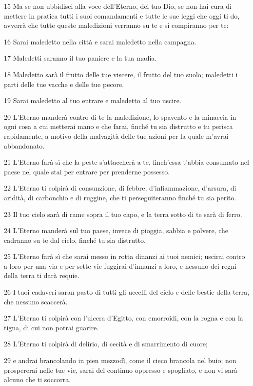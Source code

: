 \par 15 Ma se non ubbidisci alla voce dell'Eterno, del tuo Dio, se non hai cura di mettere in pratica tutti i suoi comandamenti e tutte le sue leggi che oggi ti do, avverrà che tutte queste maledizioni verranno su te e si compiranno per te:
\par 16 Sarai maledetto nella città e sarai maledetto nella campagna.
\par 17 Maledetti saranno il tuo paniere e la tua madia.
\par 18 Maledetto sarà il frutto delle tue viscere, il frutto del tuo suolo; maledetti i parti delle tue vacche e delle tue pecore.
\par 19 Sarai maledetto al tuo entrare e maledetto al tuo uscire.
\par 20 L'Eterno manderà contro di te la maledizione, lo spavento e la minaccia in ogni cosa a cui metterai mano e che farai, finché tu sia distrutto e tu perisca rapidamente, a motivo della malvagità delle tue azioni per la quale m'avrai abbandonato.
\par 21 L'Eterno farà sì che la peste s'attaccherà a te, finch'essa t'abbia consumato nel paese nel quale stai per entrare per prenderne possesso.
\par 22 L'Eterno ti colpirà di consunzione, di febbre, d'infiammazione, d'arsura, di aridità, di carbonchio e di ruggine, che ti perseguiteranno finché tu sia perito.
\par 23 Il tuo cielo sarà di rame sopra il tuo capo, e la terra sotto di te sarà di ferro.
\par 24 L'Eterno manderà sul tuo paese, invece di pioggia, sabbia e polvere, che cadranno su te dal cielo, finché tu sia distrutto.
\par 25 L'Eterno farà sì che sarai messo in rotta dinanzi ai tuoi nemici; uscirai contro a loro per una via e per sette vie fuggirai d'innanzi a loro, e nessuno dei regni della terra ti darà requie.
\par 26 I tuoi cadaveri saran pasto di tutti gli uccelli del cielo e delle bestie della terra, che nessuno scaccerà.
\par 27 L'Eterno ti colpirà con l'ulcera d'Egitto, con emorroidi, con la rogna e con la tigna, di cui non potrai guarire.
\par 28 L'Eterno ti colpirà di delirio, di cecità e di smarrimento di cuore;
\par 29 e andrai brancolando in pien mezzodì, come il cieco brancola nel buio; non prospererai nelle tue vie, sarai del continuo oppresso e spogliato, e non vi sarà alcuno che ti soccorra.

